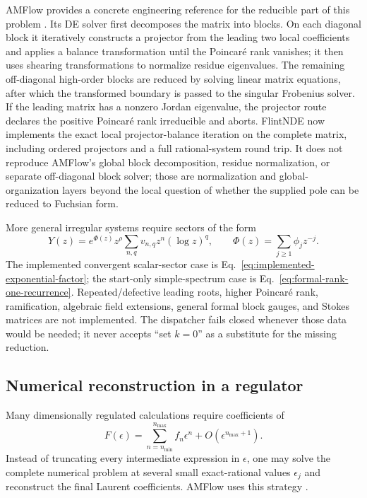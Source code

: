 \documentclass[11pt]{article}
\newcommand{\eps}{\epsilon}
\begin{document}
AMFlow provides a concrete engineering reference for the reducible part of this problem
\cite{Liu:2022chg,Huang:2026rjb}.  Its DE solver first decomposes the matrix into blocks.  On
each diagonal block it iteratively constructs a projector from the leading two local
coefficients and applies a balance transformation until the Poincar\'e rank vanishes; it then
uses shearing transformations to normalize residue eigenvalues.  The remaining
off-diagonal high-order blocks are reduced by solving linear matrix equations, after which
the transformed boundary is passed to the singular Frobenius solver.  If the leading matrix
has a nonzero Jordan eigenvalue, the projector route declares the positive Poincar\'e rank
irreducible and aborts.  FlintNDE now implements the exact local projector-balance iteration
on the complete matrix, including ordered projectors and a full rational-system round trip.
It does not reproduce AMFlow's global block decomposition, residue normalization, or separate
off-diagonal block solver; those are normalization and global-organization layers beyond the
local question of whether the supplied pole can be reduced to Fuchsian form.

More general irregular systems require sectors of the form
\begin{equation}
  Y(z)=e^{\Phi(z)}z^\rho
  \sum_{n,q}v_{n,q}z^n(\log z)^q,
  \qquad
  \Phi(z)=\sum_{j\geq1}\phi_j z^{-j}.
  \label{eq:irregular-ansatz}
\end{equation}
The implemented convergent scalar-sector case is
Eq.~\eqref{eq:implemented-exponential-factor}; the start-only simple-spectrum case is
Eq.~\eqref{eq:formal-rank-one-recurrence}.  Repeated/defective leading roots, higher
Poincar\'e rank, ramification, algebraic field extensions, general formal block gauges, and
Stokes matrices are not implemented.  The dispatcher fails closed whenever those data would
be needed; it never accepts ``set $k=0$'' as a substitute for the missing reduction.

\subsection{Numerical reconstruction in a regulator}
\label{sec:regulator-reconstruction}
\label{subsec:reconstruction-details}

Many dimensionally regulated calculations require coefficients of
\begin{equation}
  F(\eps)=\sum_{n=n_{\min}}^{n_{\max}}f_n\eps^n+O(\eps^{n_{\max}+1}).
\end{equation}
Instead of truncating every intermediate expression in $\eps$, one may solve the complete
numerical problem at several small exact-rational values $\eps_j$ and reconstruct the final
Laurent coefficients.  AMFlow uses this strategy \cite{Liu:2022chg}.
\end{document}
